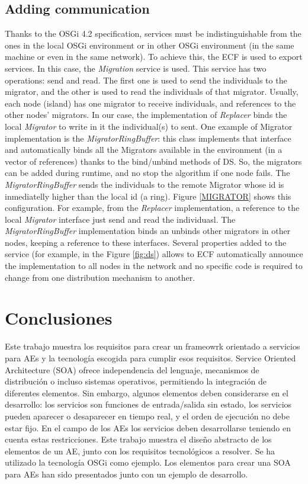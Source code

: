 \documentclass[runningheads]{llncs}
\begin{document}
\subsection{Adding communication}
Thanks to the OSGi 4.2 specification, services must be indistinguishable from the ones in the local OSGi environment or in other OSGi environment (in the same machine or even in the same network). To achieve this, the ECF is used to export services. In this case, the {\em Migration} service is used. This service has two operations: send and read. The first one is used to send the individuals to the migrator, and the other is used to read the individuals of that migrator. Usually, each node (island) has one migrator to receive individuals, and references to the other nodes' migrators. In our case, the implementation of {\em Replacer} binds the local {\em Migrator} to write in it the individual(s) to sent. One example of Migrator implementation is the {\em MigratorRingBuffer}: this class implements that interface and automatically binds all the Migrators available in the environment (in a vector of references) thanks to the bind/unbind methods of DS. So, the migrators can be added during runtime, and no stop the algorithm if one node fails.  The {\em MigratorRingBuffer} sends the individuals to the remote Migrator whose id is inmediatelly higher than the local id (a ring). Figure \ref{MIGRATOR} shows this configuration. For example, from the {\em Replacer} implementation, a reference to the local {\em Migrator} interface just send and read the individuasl. The {\em MigratorRingBuffer} implementation binds an unbinds other migrators in other nodes, keeping a reference to these interfaces. Several properties added to the service (for example, in the Figure \ref{fig:ds}) allows to ECF automatically announce the implementation to all nodes in the network and no specific code is required to change from one distribution mechanism to another. 

\section{Conclusiones}
\label{sec:conclusions}
Este trabajo muestra los requisitos para crear un frameowrk orientado a servicios para AEs y la tecnología escogida para cumplir esos requisitos.  Service Oriented Architecture (SOA) ofrece independencia del lenguaje, mecanismos de distribución o incluso sistemas operativos, permitiendo la integración de diferentes elementos. Sin embargo, algunos elementos deben considerarse en el desarrollo: los servicios son funciones de entrada/salida sin estado, los servicios pueden aparecer o desaparecer en tiempo real, y el orden de ejecución no debe estar fijo. En el campo de los AEs los servicios deben desarrollarse teniendo en cuenta estas restricciones. Este trabajo muestra el diseño abstracto de los elementos de un AE, junto con los requisitos tecnológicos a resolver. Se ha utilizado la tecnología OSGi como ejemplo. Los elementos para crear una SOA para AEs han sido presentados junto con un ejemplo de desarrollo.
\end{document}
